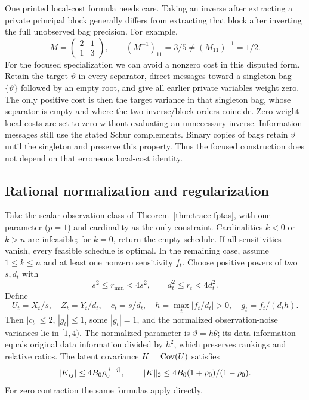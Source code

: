 One printed local-cost formula needs care. Taking an inverse after extracting
a private principal block generally differs from extracting that block after
inverting the full unobserved bag precision. For example,
\[
 M=\begin{pmatrix}2&1\\1&3\end{pmatrix},\qquad
 (M^{-1})_{11}=3/5\ne (M_{11})^{-1}=1/2.
\]
For the focused specialization we can avoid a nonzero cost in this disputed
form. Retain the target $\vartheta$ in every separator, direct messages
toward a singleton bag $\{\vartheta\}$ followed by an empty root, and give
all earlier private variables weight zero. The only positive cost is then
the target variance in that singleton bag, whose separator is empty and
where the two inverse/block orders coincide. Zero-weight local costs are
set to zero without evaluating an unnecessary inverse. Information messages
still use the stated Schur complements. Binary copies of bags retain
$\vartheta$ until the singleton and preserve this property. Thus the
focused construction does not depend on that erroneous local-cost identity.

\subsection{Rational normalization and regularization}
Take the scalar-observation class of Theorem~\ref{thm:trace-fptas}, with one
parameter ($p=1$) and cardinality as the only constraint. Cardinalities $k<0$
or $k>n$ are infeasible; for $k=0$, return the empty schedule. If all
sensitivities vanish, every feasible schedule is optimal. In the remaining
case, assume $1\le k\le n$ and at least one nonzero sensitivity $f_t$.
Choose positive powers of two $s,d_t$ with
\[
 s^2\le r_{\min}<4s^2,\qquad d_t^2\le r_t<4d_t^2.
\]
Define
\[
 U_t=X_t/s,\quad Z_t=Y_t/d_t,\quad c_t=s/d_t,
 \quad h=\max_t|f_t/d_t|>0,\quad g_t=f_t/(d_th).
\]
Then $|c_t|\le2$, $|g_t|\le1$, some $|g_t|=1$, and the normalized
observation-noise variances lie in $[1,4)$. The normalized parameter is
$\vartheta=h\theta$; its data information equals original data information
divided by $h^2$, which preserves rankings and relative ratios. The latent
covariance $K=\operatorname{Cov}(U)$ satisfies
\[
 |K_{ij}|\le4B_0\rho_0^{|i-j|},\qquad
 \lVert K\rVert_2\le4B_0(1+\rho_0)/(1-\rho_0).
\]
For zero contraction the same formulas apply directly.

